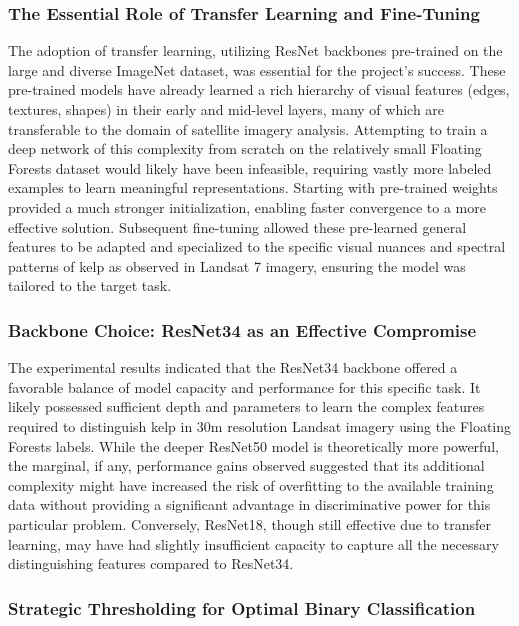 \documentclass{article}
\begin{document}
\subsubsection{The Essential Role of Transfer Learning and Fine-Tuning}

The adoption of transfer learning, utilizing ResNet backbones pre-trained on the large and diverse ImageNet dataset, was essential for the project's success. These pre-trained models have already learned a rich hierarchy of visual features (edges, textures, shapes) in their early and mid-level layers, many of which are transferable to the domain of satellite imagery analysis. Attempting to train a deep network of this complexity from scratch on the relatively small Floating Forests dataset would likely have been infeasible, requiring vastly more labeled examples to learn meaningful representations. Starting with pre-trained weights provided a much stronger initialization, enabling faster convergence to a more effective solution. Subsequent fine-tuning allowed these pre-learned general features to be adapted and specialized to the specific visual nuances and spectral patterns of kelp as observed in Landsat 7 imagery, ensuring the model was tailored to the target task.

\subsubsection{Backbone Choice: ResNet34 as an Effective Compromise}

The experimental results indicated that the ResNet34 backbone offered a favorable balance of model capacity and performance for this specific task. It likely possessed sufficient depth and parameters to learn the complex features required to distinguish kelp in 30m resolution Landsat imagery using the Floating Forests labels. While the deeper ResNet50 model is theoretically more powerful, the marginal, if any, performance gains observed suggested that its additional complexity might have increased the risk of overfitting to the available training data without providing a significant advantage in discriminative power for this particular problem. Conversely, ResNet18, though still effective due to transfer learning, may have had slightly insufficient capacity to capture all the necessary distinguishing features compared to ResNet34.

\subsubsection{Strategic Thresholding for Optimal Binary Classification}
\end{document}
